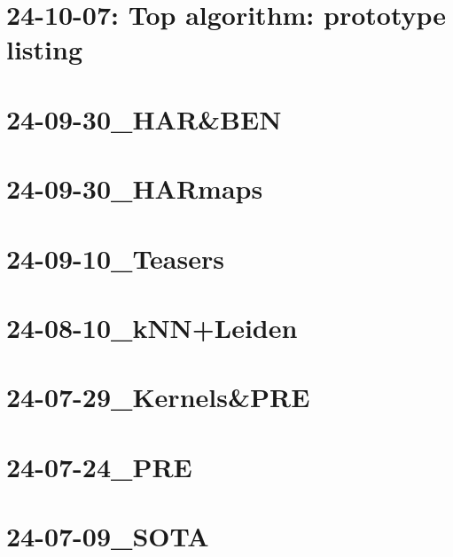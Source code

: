 \documentclass[11pt]{article}
\begin{document}
\clearpage

\tableofcontents


\clearpage

\section{24-10-07: Top algorithm: prototype listing}


\section{24-09-30\_HAR\&BEN}

\section{24-09-30\_HARmaps}

\section{24-09-10\_Teasers}

\section{24-08-10\_kNN+Leiden}

\section{24-07-29\_Kernels\&PRE}

\section{24-07-24\_PRE}

\section{24-07-09\_SOTA}


\printbibliography
\end{document}
